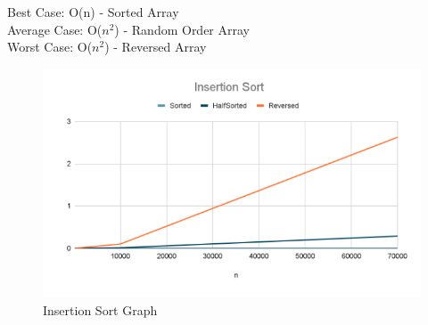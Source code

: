 \documentclass[12pt]{article}
\begin{document}
	Best Case: O(n) - Sorted Array\\
	\indent Average Case: O($n^2$) - Random Order Array\\
	\indent Worst Case: O($n^2$) - Reversed Array\\
\begin{figure}[h]
	\centering
	\includegraphics[width=\textwidth]{Insertion Graph.PNG}
\caption{Insertion Sort Graph}
    \label{fig:mesh1}
\end{figure}
\end{document}
